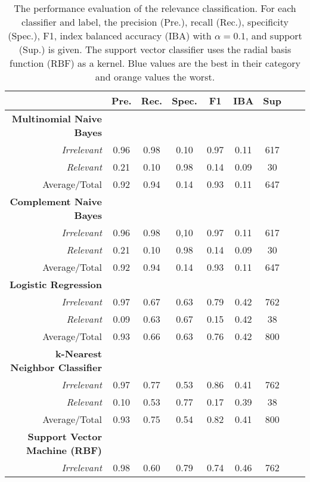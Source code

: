   \begin{table}[h!]
    \caption{The performance evaluation of the relevance classification. For each classifier and label, the precision (Pre.), recall (Rec.), specificity (Spec.), F1, index balanced accuracy (IBA) with $\alpha = 0.1$, and support (Sup.) is given. The support vector classifier uses the radial basis function (RBF) as a kernel. Blue values are the best in their category and orange values the worst.}
    \centering
    \begin{tabular}{@{}rcccccccc@{}}
      \toprule
       & \textbf{Pre.} & \textbf{Rec.} & \textbf{Spec.}
      & \textbf{F1} & \textbf{IBA}& \textbf{Sup} \\
      \midrule
      \textbf{Multinomial Naive Bayes}\\
      \textsl{Irrelevant}& 0.96& 0.98& 0.10& 0.97& 0.11& 617 \\
      \textsl{Relevant}& 0.21& 0.10& 0.98& 0.14& 0.09& 30 \\
      Average/Total& 0.92& 0.94& 0.14& 0.93& 0.11& 647 \vspace{2mm}\\
      \textbf{Complement Naive Bayes}\\
      \textsl{Irrelevant}& 0.96& 0.98& 0,10& 0.97& 0.11& 617 \\
      \textsl{Relevant}& 0.21& 0.10& 0.98& 0.14& 0.09& 30 \\
      Average/Total& 0.92& 0.94& 0.14& 0.93& 0.11& 647 \vspace{2mm}\\
      \textbf{Logistic Regression}\\
      \textsl{Irrelevant}& 0.97& 0.67& 0.63& 0.79& 0.42& 762 \\
      \textsl{Relevant}& 0.09& 0.63& 0.67& 0.15& 0.42& 38 \\
      Average/Total& 0.93& 0.66& 0.63& 0.76& 0.42& 800 \vspace{2mm}\\
      \textbf{k-Nearest Neighbor Classifier}\\
      \textsl{Irrelevant}& 0.97& 0.77& 0.53& 0.86& 0.41& 762 \\
      \textsl{Relevant}& 0.10& 0.53& 0.77& 0.17& 0.39& 38 \\
      Average/Total& 0.93& 0.75& 0.54& 0.82& 0.41& 800 \vspace{2mm}\\
      \textbf{Support Vector Machine (RBF)}\\
      \textsl{Irrelevant}& 0.98& 0.60& 0.79& 0.74& 0.46& 762 \\

\end{tabular}
\end{table}
